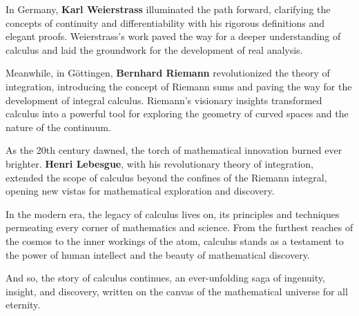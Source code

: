In Germany, \textbf{Karl Weierstrass} illuminated the path forward, clarifying the concepts of continuity and differentiability with his rigorous definitions and elegant proofs. Weierstrass's work paved the way for a deeper understanding of calculus and laid the groundwork for the development of real analysis.

Meanwhile, in Göttingen, \textbf{Bernhard Riemann} revolutionized the theory of integration, introducing the concept of Riemann sums and paving the way for the development of integral calculus. Riemann's visionary insights transformed calculus into a powerful tool for exploring the geometry of curved spaces and the nature of the continuum.

As the 20th century dawned, the torch of mathematical innovation burned ever brighter. \textbf{Henri Lebesgue}, with his revolutionary theory of integration, extended the scope of calculus beyond the confines of the Riemann integral, opening new vistas for mathematical exploration and discovery.

In the modern era, the legacy of calculus lives on, its principles and techniques permeating every corner of mathematics and science. From the furthest reaches of the cosmos to the inner workings of the atom, calculus stands as a testament to the power of human intellect and the beauty of mathematical discovery.

And so, the story of calculus continues, an ever-unfolding saga of ingenuity, insight, and discovery, written on the canvas of the mathematical universe for all eternity.
